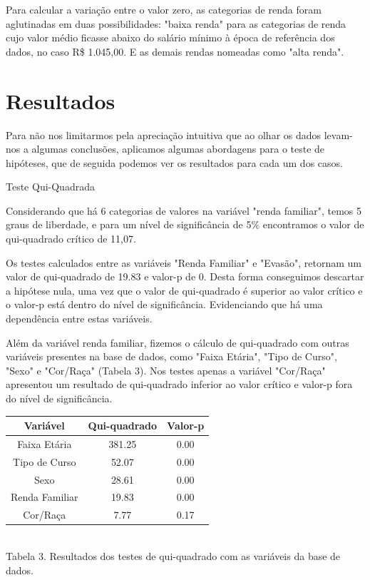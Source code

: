 \documentclass[conference]{IEEEtran}
\begin{document}
Para calcular a variação entre o valor zero, as categorias de renda foram aglutinadas em duas possibilidades: "baixa renda" para as categorias de renda cujo valor médio ficasse abaixo do salário mínimo à época de referência dos dados, no caso R\$ 1.045,00. E as demais rendas nomeadas como "alta renda".

\section{Resultados}
Para não nos limitarmos pela apreciação intuitiva que ao olhar os dados levam-nos a algumas conclusões, aplicamos algumas abordagens para o teste de hipóteses, que de seguida podemos ver os resultados para cada um dos casos.\par

Teste Qui-Quadrada\par
Considerando que há 6 categorias de valores na variável "renda familiar", temos 5 graus de liberdade, e para um nível de significância de 5\% encontramos o valor de qui-quadrado crítico de 11,07.\par
Os testes calculados entre as variáveis "Renda Familiar" e "Evasão", retornam um valor de qui-quadrado de 19.83 e valor-p de 0. Desta forma conseguimos descartar a hipótese nula, uma vez que o valor de qui-quadrado é superior ao valor crítico e o valor-p está dentro do nível de significância. Evidenciando que há uma dependência entre estas variáveis.\par

Além da variável renda familiar, fizemos o cálculo de qui-quadrado com outras variáveis presentes na base de dados, como "Faixa Etária", "Tipo de Curso", "Sexo" e "Cor/Raça" (Tabela 3). Nos testes apenas a variável "Cor/Raça" apresentou um resultado de qui-quadrado inferior ao valor crítico e valor-p fora do nível de significância.\par

\begin{center}
    \begin{tabular}{ |c|c|c| } 
        \hline
        \textbf{Variável} & \textbf{Qui-quadrado} & \textbf{Valor-p} \\
        \hline
        Faixa Etária & 381.25 & 0.00 \\
        \hline
        Tipo de Curso & 52.07 & 0.00 \\
        \hline
        Sexo & 28.61 & 0.00 \\
        \hline
        Renda Familiar & 19.83 & 0.00 \\
        \hline
        Cor/Raça & 7.77 & 0.17 \\
        \hline
    \end{tabular} \\
    Tabela 3. Resultados dos testes de qui-quadrado com as variáveis da base de dados.
\end{center}
\end{document}
